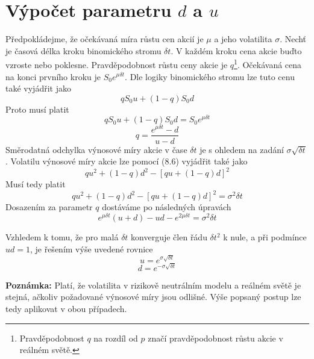 \documentclass[a4paper]{book}
\begin{document}
\section{Výpočet parametru $d$ a $u$}

Předpokládejme, že očekávaná míra růstu cen akcií je $\mu$ a jeho volatilita $\sigma$. Nechť je časová délka kroku binomického stromu $\delta t$. V každém kroku cena akcie buďto vzroste nebo poklesne. Pravděpodobnost růstu ceny akcie je $q$\footnote{Pravděpodobnost $q$ na rozdíl od $p$ značí pravděpodobnost růstu akcie v reálném světě.}. Očekávaná cena na konci prvního kroku je $S_0 e^{\mu \delta t}$. Dle logiky binomického stromu lze tuto cenu také vyjádřit jako
\begin{equation*}
q S_0u + (1-q)S_0d
\end{equation*}
Proto musí platit
\begin{equation}
q S_0u + (1-q)S_0d = S_0 e^{\mu \delta t}
\end{equation}
\begin{equation*}
q = \frac {e^{\mu \delta t} - d}{u - d}
\end{equation*}
Směrodatná odchylka výnosové míry akcie v čase $\delta t$ je s ohledem na zadání $\sigma \sqrt{\delta t}$. Volatilu výnosové míry akcie lze pomocí (8.6) vyjádřit také jako
\begin{equation*}
q u^2 + (1-q)d^2 - [qu+(1-q)d]^2
\end{equation*}
Musí tedy platit
\begin{equation*}
q u^2 + (1-q)d^2 - [qu+(1-q)d]^2 = \sigma^2 \delta t
\end{equation*}
Dosazením za parametr $q$ dostáváme po následných úpravách
\begin{equation*}
e^{\mu \delta t}(u+d)-ud-e^{2 \mu \delta t}= \sigma^2 \delta t
\end{equation*}

Vzhledem k tomu, že pro malá $\delta t$ konverguje člen řádu $\delta t^2$ k nule, a při podmínce $ud = 1$, je řešením výše uvedené rovnice
\begin{equation*}
u = e^{\sigma \sqrt{\delta t}}
\end{equation*}
\begin{equation*}
d = e^{-\sigma \sqrt{\delta t}}
\end{equation*}

\noindent \textbf{Poznámka:} Platí, že volatilita v rizikově neutrálním modelu a reálném světě je stejná, ačkoliv požadované výnosové míry jsou odlišné. Výše popsaný postup lze tedy aplikovat v obou případech.
\end{document}
